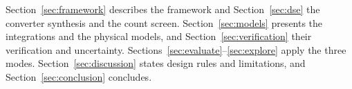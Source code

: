Section~\ref{sec:framework} describes the framework and Section~\ref{sec:dse} the converter
synthesis and the count screen. Section~\ref{sec:models} presents the integrations and the
physical models, and Section~\ref{sec:verification} their verification and uncertainty.
Sections~\ref{sec:evaluate}--\ref{sec:explore} apply the three modes.
Section~\ref{sec:discussion} states design rules and limitations, and
Section~\ref{sec:conclusion} concludes.
